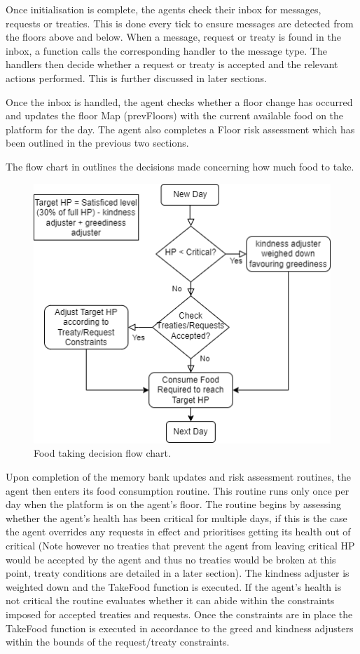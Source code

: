 Once initialisation is complete, the agents check their inbox for messages, requests or treaties. This is done every tick to ensure messages are detected from the floors above and below. When a message, request or treaty is found in the inbox, a function calls the corresponding handler to the message type. The handlers then decide whether a request or treaty is accepted and the relevant actions performed. This is further discussed in later sections. 

Once the inbox is handled, the agent checks whether a floor change has occurred and updates the floor Map (prevFloors) with the current available food on the platform for the day. The agent also completes a Floor risk assessment which has been outlined in the previous two sections. 

The flow chart in  outlines the decisions made concerning how much food to take.

\begin{figure}[h!]
    \begin{center}
        \includegraphics[scale=0.75]{009_team_7_agent_design/Images/v2.drawio.png}
    \end{center}
    \caption{Food taking decision flow chart.}
    \label{fig: operation flow chart}
\end{figure}

Upon completion of the memory bank updates and risk assessment routines, the agent then enters its food consumption routine. This routine runs only once per day when the platform is on the agent's floor. The routine begins by assessing whether the agent's health has been critical for multiple days, if this is the case the agent overrides any requests in effect and prioritises getting its health out of critical (Note however no treaties that prevent the agent from leaving critical HP would be accepted by the agent and thus no treaties would be broken at this point, treaty conditions are detailed in a later section). The kindness adjuster is weighted down and the TakeFood function is executed. If the agent's health is not critical the routine evaluates whether it can abide within the constraints imposed for accepted treaties and requests. Once the constraints are in place the TakeFood function is executed in accordance to the greed and kindness adjusters within the bounds of the request/treaty constraints. 


